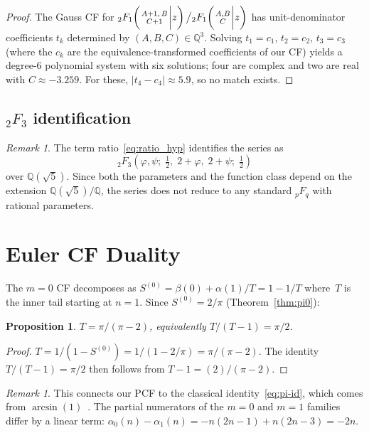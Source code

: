 \documentclass[11pt,a4paper]{article}
\theoremstyle{plain}
\newtheorem{proposition}[theorem]{Proposition}
\theoremstyle{definition}
\theoremstyle{remark}
\newtheorem{remark}[theorem]{Remark}
\newcommand{\half}{\tfrac{1}{2}}
\newcommand{\hyp}[5]{{{}_{#1}F_{#2}}\!\left(\genfrac{}{}{0pt}{}{#3}{#4}\bigg|#5\right)}
\begin{document}
\begin{proof}
The Gauss CF for
$\hyp21{A{+}1,\,B}{C{+}1}{z}\big/\hyp21{A,B}{C}{z}$
has unit-denominator coefficients $t_k$ determined by
$(A,B,C)\in\mathbb{Q}^3$.
Solving $t_1=c_1$, $t_2=c_2$, $t_3=c_3$ (where the $c_k$ are the
equivalence-transformed coefficients of our CF) yields a degree-6
polynomial system with six solutions; four are complex and two are
real with $C \approx -3.259$.
For these,
$|t_4 - c_4| \approx 5.9$, so no match exists.
\end{proof}

\subsection{\texorpdfstring{${}_2F_3$}{2F3} identification}

\begin{remark}\label{rem:2f3}
The term ratio~\eqref{eq:ratio_hyp} identifies the series as
\[
  {}_2F_3\!\left(\varphi,\psi;\;\half,\;2{+}\varphi,\;2{+}\psi;\;
  \half\right)
\]
over $\mathbb{Q}(\sqrt5)$.
Since both the parameters and the function class depend on the
extension $\mathbb{Q}(\sqrt5)/\mathbb{Q}$, the series does not
reduce to any standard ${}_pF_q$ with rational parameters.
\end{remark}

\section{Euler CF Duality}\label{sec:euler}

The $m=0$ CF decomposes as
$S^{(0)} = \beta(0) + \alpha(1)/T = 1 - 1/T$
where~$T$ is the inner tail starting at $n = 1$.
Since $S^{(0)} = 2/\pi$ (Theorem~\ref{thm:pi0}):

\begin{proposition}\label{prop:euler}
$T = \pi/(\pi - 2)$, equivalently
$T/(T{-}1) = \pi/2$.
\end{proposition}

\begin{proof}
$T = 1/(1 - S^{(0)}) = 1/(1 - 2/\pi) = \pi/(\pi - 2)$.
The identity $T/(T{-}1) = \pi/2$ then follows from
$T - 1 = (2)/(\pi - 2)$.
\end{proof}

\begin{remark}
This connects our PCF to the classical identity~\eqref{eq:pi-id}, which comes
from $\arcsin(1)$~\cite[\S4.24.2]{dlmf}.
The partial numerators of the $m=0$ and $m=1$ families differ
by a linear term:
$\alpha_0(n) - \alpha_1(n) = -n(2n{-}1) + n(2n{-}3) = -2n$.
\end{remark}
\end{document}
